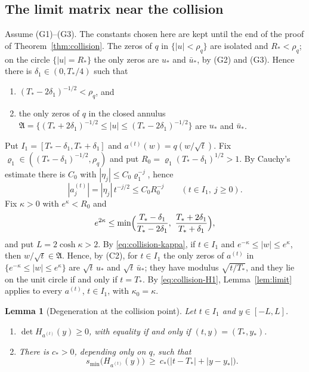 \documentclass[11pt]{amsart}
\newtheorem{lemma}[theorem]{Lemma}
\theoremstyle{definition}
\theoremstyle{remark}
\numberwithin{equation}{section}
\begin{document}
\subsection{The limit matrix near the collision}\label{subsec:collision-limit}
Assume (G1)--(G3). The constants chosen here are kept until the end of the proof of Theorem~\ref{thm:collision}. The zeros of $q$ in $\{|u|<\rho_q\}$ are isolated and $R_*<\rho_q$; on the circle $\{|u|=R_*\}$ the only zeros are $u_*$ and $\bar u_*$, by (G2) and (G3). Hence there is $\delta_1\in(0,T_*/4)$ such that
\begin{enumerate}
\item[(C1)] $(T_*-2\delta_1)^{-1/2}<\rho_q$, and
\item[(C2)] the only zeros of $q$ in the closed annulus $\mathfrak A=\{(T_*+2\delta_1)^{-1/2}\le|u|\le(T_*-2\delta_1)^{-1/2}\}$ are $u_*$ and $\bar u_*$.
\end{enumerate}
Put $I_1=[T_*-\delta_1,T_*+\delta_1]$ and $a^{(t)}(w)=q(w/\sqrt t)$. Fix $\varrho_1\in((T_*-\delta_1)^{-1/2},\rho_q)$ and put $R_0=\varrho_1(T_*-\delta_1)^{1/2}>1$. By Cauchy's estimate there is $C_0$ with $|\eta_j|\le C_0\varrho_1^{-j}$, hence
\begin{equation}\label{eq:collision-H1}
|a_j^{(t)}|=|\eta_j|\,t^{-j/2}\le C_0R_0^{-j}\qquad(t\in I_1,\ j\ge0).
\end{equation}
Fix $\kappa>0$ with $e^\kappa<R_0$ and
\begin{equation}\label{eq:collision-kappa}
e^{2\kappa}\le\min\Bigl(\frac{T_*-\delta_1}{T_*-2\delta_1},\ \frac{T_*+2\delta_1}{T_*+\delta_1}\Bigr),
\end{equation}
and put $L=2\cosh\kappa>2$. By \eqref{eq:collision-kappa}, if $t\in I_1$ and $e^{-\kappa}\le|w|\le e^\kappa$, then $w/\sqrt t\in\mathfrak A$. Hence, by (C2), for $t\in I_1$ the only zeros of $a^{(t)}$ in $\{e^{-\kappa}\le|w|\le e^\kappa\}$ are $\sqrt t\,u_*$ and $\sqrt t\,\bar u_*$; they have modulus $\sqrt{t/T_*}$, and they lie on the unit circle if and only if $t=T_*$. By \eqref{eq:collision-H1}, Lemma~\ref{lem:limit} applies to every $a^{(t)}$, $t\in I_1$, with $\kappa_0=\kappa$.

\begin{lemma}[Degeneration at the collision point]\label{lem:degenerate}
Let $t\in I_1$ and $y\in[-L,L]$.
\begin{enumerate}
\item[(a)] $\det H_{a^{(t)}}(y)\ge0$, with equality if and only if $(t,y)=(T_*,y_*)$.
\item[(b)] There is $c_*>0$, depending only on $q$, such that
\[
s_{\min}\bigl(H_{a^{(t)}}(y)\bigr)\ \ge\ c_*\bigl(|t-T_*|+|y-y_*|\bigr).
\]
\end{enumerate}
\end{lemma}
\end{document}
